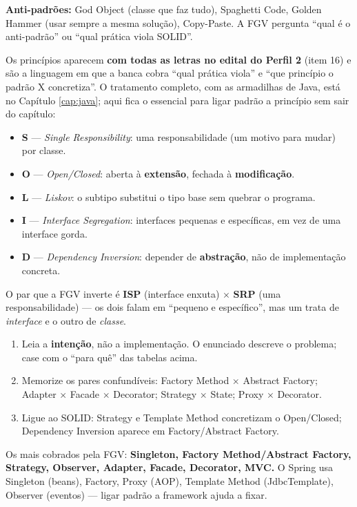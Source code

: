 \textbf{Anti-padrões:} God Object (classe que faz tudo), Spaghetti Code,
Golden Hammer (usar sempre a mesma solução), Copy-Paste. A FGV pergunta ``qual
é o anti-padrão'' ou ``qual prática viola SOLID''.

\begin{conceito}
Os princípios aparecem \textbf{com todas as letras no edital do Perfil 2}
(item 16) e são a linguagem em que a banca cobra ``qual prática viola'' e
``que princípio o padrão X concretiza''. O tratamento completo, com as
armadilhas de Java, está no Capítulo \ref{cap:java}; aqui fica o essencial
para ligar padrão a princípio sem sair do capítulo:

\begin{itemize}
\item \textbf{S} --- \emph{Single Responsibility}: uma responsabilidade (um
motivo para mudar) por classe.
\item \textbf{O} --- \emph{Open/Closed}: aberta à \textbf{extensão}, fechada à
\textbf{modificação}.
\item \textbf{L} --- \emph{Liskov}: o subtipo substitui o tipo base sem
quebrar o programa.
\item \textbf{I} --- \emph{Interface Segregation}: interfaces pequenas e
específicas, em vez de uma interface gorda.
\item \textbf{D} --- \emph{Dependency Inversion}: depender de
\textbf{abstração}, não de implementação concreta.
\end{itemize}

O par que a FGV inverte é \textbf{ISP} (interface enxuta) $\times$
\textbf{SRP} (uma responsabilidade) --- os dois falam em ``pequeno e
específico'', mas um trata de \emph{interface} e o outro de \emph{classe}.
\end{conceito}

\begin{comosair}
\begin{enumerate}
\item Leia a \textbf{intenção}, não a implementação. O enunciado descreve o
problema; case com o ``para quê'' das tabelas acima.
\item Memorize os pares confundíveis: Factory Method $\times$ Abstract
Factory; Adapter $\times$ Facade $\times$ Decorator; Strategy $\times$ State;
Proxy $\times$ Decorator.
\item Ligue ao SOLID: Strategy e Template Method concretizam o Open/Closed;
Dependency Inversion aparece em Factory/Abstract Factory.
\end{enumerate}
Os mais cobrados pela FGV: \textbf{Singleton, Factory Method/Abstract
Factory, Strategy, Observer, Adapter, Facade, Decorator, MVC.} O Spring usa
Singleton (beans), Factory, Proxy (AOP), Template Method (JdbcTemplate),
Observer (eventos) --- ligar padrão a framework ajuda a fixar.
\end{comosair}

